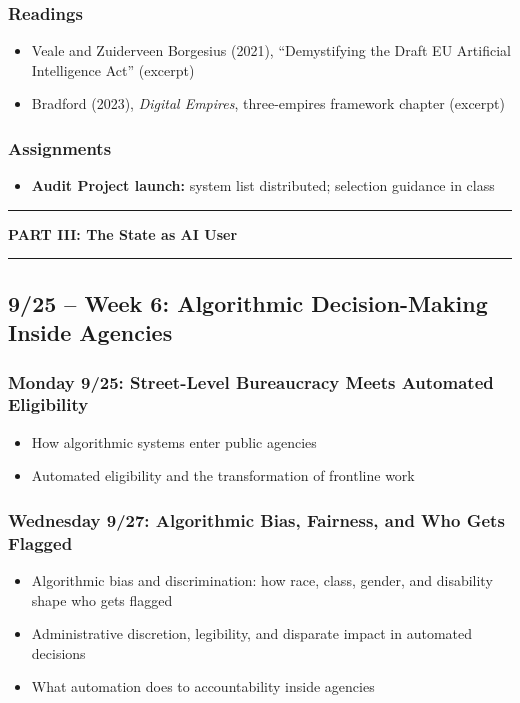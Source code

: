 \documentclass[12pt]{article}
\begin{document}
    \subsubsection*{Readings}
        \begin{itemize}
            \item Veale and Zuiderveen Borgesius (2021), ``Demystifying the Draft EU Artificial Intelligence Act'' (excerpt)
            \item Bradford (2023), \emph{Digital Empires}, three-empires framework chapter (excerpt)
        \end{itemize}
    \subsubsection*{Assignments}
        \begin{itemize}
            \item \textbf{Audit Project launch:} system list distributed; selection guidance in class
        \end{itemize}

\bigskip
\noindent\rule{\textwidth}{0.6pt}
\begin{center}\textbf{PART III: The State as AI User}\end{center}
\noindent\rule{\textwidth}{0.6pt}

\subsection*{9/25 -- Week 6: Algorithmic Decision-Making Inside Agencies}
    \subsubsection*{Monday 9/25: Street-Level Bureaucracy Meets Automated Eligibility}
        \begin{itemize}
            \item How algorithmic systems enter public agencies
            \item Automated eligibility and the transformation of frontline work
        \end{itemize}
    \subsubsection*{Wednesday 9/27: Algorithmic Bias, Fairness, and Who Gets Flagged}
        \begin{itemize}
            \item Algorithmic bias and discrimination: how race, class, gender, and disability shape who gets flagged
            \item Administrative discretion, legibility, and disparate impact in automated decisions
            \item What automation does to accountability inside agencies
        \end{itemize}
\end{document}
